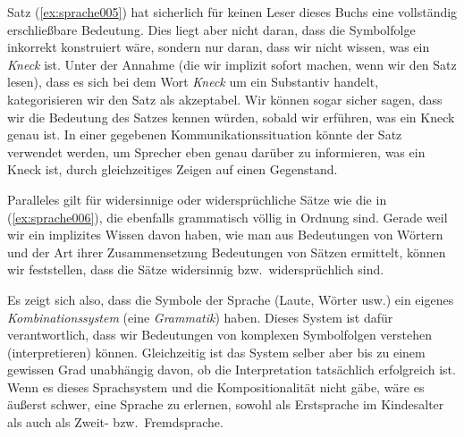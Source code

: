 Satz (\ref{ex:sprache005}) hat sicherlich für keinen Leser dieses Buchs eine vollständig er\-schließ\-bare Bedeutung.
Dies liegt aber nicht daran, dass die Symbolfolge inkorrekt konstruiert wäre, sondern nur daran, dass wir nicht wissen, was ein \textit{Kneck} ist.
Unter der Annahme (die wir implizit sofort machen, wenn wir den Satz lesen), dass es sich bei dem Wort \textit{Kneck} um ein Substantiv handelt, kategorisieren wir den Satz als akzeptabel.
Wir können sogar sicher sagen, dass wir die Bedeutung des Satzes kennen würden, sobald wir erführen, was ein Kneck genau ist.
In einer gegebenen Kommunikationssituation könnte der Satz verwendet werden, um Sprecher eben genau darüber zu informieren, was ein Kneck ist, \zB durch gleichzeitiges Zeigen auf einen Gegenstand.

Paralleles gilt für widersinnige oder widersprüchliche Sätze wie die in (\ref{ex:sprache006}), die ebenfalls grammatisch völlig in Ordnung sind.
Gerade weil wir ein implizites Wissen davon haben, wie man aus Bedeutungen von Wörtern und der Art ihrer Zusammensetzung Bedeutungen von Sätzen ermittelt, können wir feststellen, dass die Sätze widersinnig bzw.\ widersprüchlich sind.

\begin{exe}
  \ex\label{ex:sprache006}
  \begin{xlist}
  \end{xlist}
\end{exe}

Es zeigt sich also, dass die Symbole der Sprache (Laute, Wörter usw.) ein eigenes \textit{Kombinationssystem} (eine \textit{Grammatik}) haben.
Dieses System ist dafür verantwortlich, dass wir Bedeutungen von komplexen Symbolfolgen verstehen (interpretieren) können.
Gleichzeitig ist das System selber aber bis zu einem gewissen Grad unabhängig davon, ob die Interpretation tatsächlich erfolgreich ist.
Wenn es dieses Sprachsystem und die Kompositionalität nicht gäbe, wäre es äußerst schwer, eine Sprache zu erlernen, sowohl als Erstsprache im Kindesalter als auch als Zweit- bzw.\ Fremdsprache.


